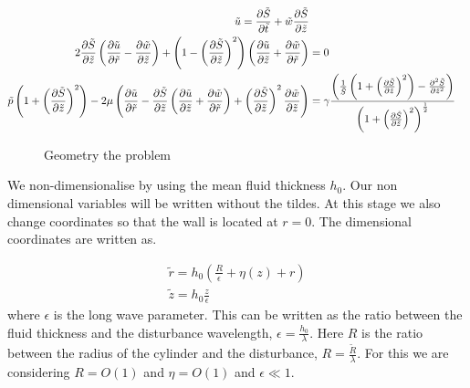 \documentclass{jfm}
\begin{document}
\begin{align}
\tilde   u=\pdv{\tilde S}{\tilde t}+\tilde w\pdv{\tilde S}{\tilde z} \\
2\pdv{\tilde S}{\tilde z}\left(\pdv{\tilde u}{\tilde r}-\pdv{\tilde w}{\tilde z}\right)+\left(1-\left(\pdv{\tilde S}{\tilde z}\right)^2\right)\left(\pdv{\tilde u}{\tilde z}+\pdv{\tilde w}{\tilde r}\right)&=0\label{tangstress}\\
\tilde p\left(1+\left(\pdv{\tilde S}{\tilde z}\right)^2\right)-2\mu\left( \pdv{\tilde u}{\tilde r}-\pdv{\tilde S}{\tilde z}\left(\pdv{\tilde u}{\tilde z}+\pdv{\tilde w}{\tilde r}\right)+\left(\pdv{\tilde S}{\tilde z}\right)^2\pdv{\tilde w}{\tilde z}\right)&=\gamma\frac{\left(\frac{1}{\tilde S}\left(1+\left(\pdv{\tilde S}{\tilde z}\right)^2\right)-\pdv[2]{\tilde S}{\tilde z}\right)}{\left(1+\left(\pdv{\tilde S}{\tilde z}\right)^2\right)^{\frac{1}{2}}}\label{normstress}
\end{align}

\begin{figure}
	\centering
	\caption{Geometry the problem\label{fig:geom}}
\end{figure}
We non-dimensionalise by using the mean fluid thickness $h_0$. Our non dimensional variables will be written without the tildes. At this stage we also change coordinates so that the wall is located at $r =0$. The dimensional coordinates are written as.


\begin{align}
	\tilde r = h_0\left(\frac{R}{\epsilon}+\eta(z) +r\right)\\
	\tilde z = h_0\frac{ z}{\epsilon}
\end{align}
where $\epsilon$ is the long wave parameter. This can be written as the ratio between the fluid thickness and the disturbance wavelength, $\epsilon = \frac{h_0}{\lambda}$. Here $R$ is the ratio between the radius of the cylinder and the disturbance, $R =\frac{\tilde{R}}{\lambda}$. For this we are considering $R = O(1)$ and $\eta = O(1)$ and $\epsilon\ll 1$. 
\end{document}
